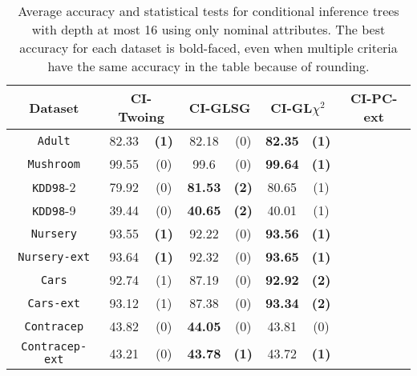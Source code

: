     \begin{table}
    \small
      \centering
        \caption{Average accuracy and statistical tests  for  conditional inference trees 
with depth at most 16 using only nominal attributes. The best accuracy for each dataset is bold-faced, even when multiple criteria have the same accuracy in the table because of rounding.}

\begin{tabular}{c|cc|cc|cc|cc} 
Dataset             & \multicolumn{2}{c|}{CI-Twoing} &   \multicolumn{2}{c|}{CI-GLSG} & \multicolumn{2}{c|}{CI-GL$\chi^2$} & \multicolumn{2}{c}{CI-PC-ext}\\  \hline   
{\tt Adult}  & 82.33      &  {\bf (1)}       &   82.18      & (0)             & {\bf 82.35} &  {\bf (1)}     & &      \\
{\tt Mushroom}      &  99.55      &  (0)             &   99.6       & (0)             & {\bf 99.64} &  {\bf (1)}     & &      \\
 {\tt KDD98}-2       &79.92      &  (0)             &  {\bf 81.53} & {\bf (2)}       &  80.65      &  (1)           & &      \\
{\tt KDD98}-9       & 39.44      &  (0)             &  {\bf 40.65} & {\bf (2)}       &  40.01      &  (1)           & &      \\
{\tt Nursery}       & 93.55      &  {\bf (1)}       &   92.22      & (0)             & {\bf 93.56} &  {\bf (1)}     & &       \\
{\tt Nursery-ext}   & 93.64      &  {\bf (1)}       &   92.32      & (0)             & {\bf 93.65} &  {\bf (1)}     & &      \\
{\tt Cars}          & 92.74      &  (1)             &   87.19      & (0)             & {\bf 92.92} &  {\bf (2)}     & &      \\
 {\tt Cars-ext}      & 93.12      &  (1)             &   87.38      & (0)             & {\bf 93.34} &  {\bf (2)}     & &      \\
 {\tt Contracep}     &43.82      &  (0)             &   {\bf 44.05}& (0)             &  43.81      &  (0)           & &      \\
 {\tt Contracep-ext} &43.21      &  (0)             &   {\bf 43.78}& {\bf (1)}       &  43.72      &  {\bf (1)}     & &      \\

\end{tabular}
\end{table}
